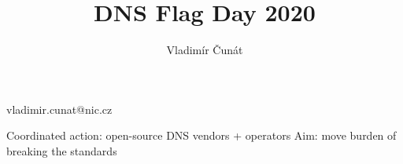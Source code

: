 
\englishenv

\pageAspectRatio[16:9]

\title{DNS Flag Day 2020\hfill{}}
\author{Vladimír Čunát}{vladimir.cunat@nic.cz}
\date[2019-11-26]

\def\newLine{\hfill\break}
\def\textSoft#1{\startCol{0.67 0.81 1   }#1\endCol}


Coordinated action: open-source DNS vendors + operators
\smallskip
Aim: move burden of breaking the standards
